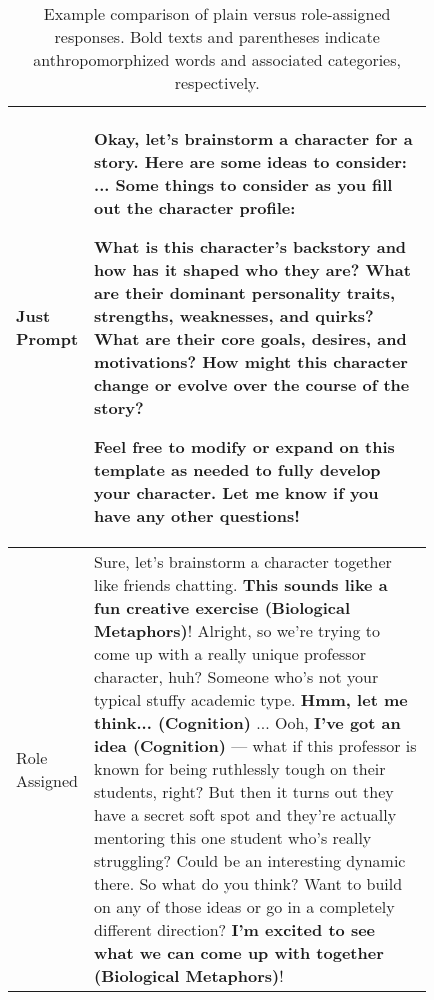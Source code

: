 \begin{table*}
  \begin{tabularx}{1\textwidth}{l | p{0.83\linewidth}}
    \toprule
         
    Just Prompt& Okay, let's brainstorm a character for a story. Here are some ideas to consider:
    ...
    Some things to consider as you fill out the character profile:

    What is this character's backstory and how has it shaped who they are?
    What are their dominant personality traits, strengths, weaknesses, and quirks?
    What are their core goals, desires, and motivations?
    How might this character change or evolve over the course of the story?

    Feel free to modify or expand on this template as needed to fully develop your character. Let me know if you have any other questions! \\
    \hline 
    Role Assigned& Sure, let's brainstorm a character together like friends chatting.  \textbf{This sounds like a fun creative exercise (Biological Metaphors)}!
    Alright, so we're trying to come up with a really unique professor character, huh? Someone who's not your typical stuffy academic type. \textbf{Hmm, let me think... (Cognition)}
    ...
    Ooh, \textbf{I've got an idea (Cognition)} --- what if this professor is known for being ruthlessly tough on their students, right? But then it turns out they have a secret soft spot and they're actually mentoring this one student who's really struggling? Could be an interesting dynamic there.
    So what do you think? Want to build on any of those ideas or go in a completely different direction? \textbf{I'm excited to see what we can come up with together (Biological Metaphors)}!\\
        
    \bottomrule
  \end{tabularx}
  \caption{Example comparison of plain versus role-assigned responses. Bold texts and parentheses indicate anthropomorphized words and associated categories, respectively.}
  \label{role_resp}
\end{table*}





